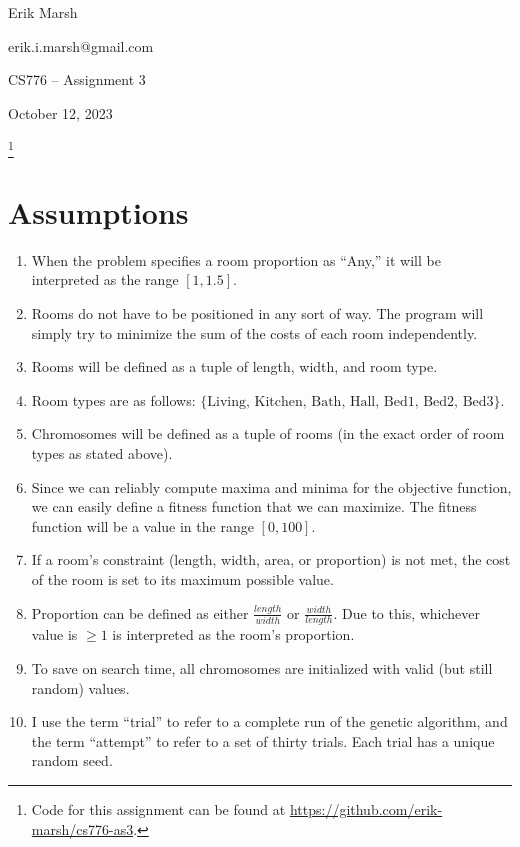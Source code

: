 \documentclass[12pt, letterpaper]{article}
\newcommand\blfootnote[1]{%
  \begingroup
  \renewcommand\thefootnote{}\footnote{#1}%
  \addtocounter{footnote}{-1}%
  \endgroup
}
\begin{document}
\noindent
Erik Marsh

\noindent
erik.i.marsh@gmail.com

\noindent
CS776 -- Assignment 3

\noindent
October 12, 2023


\blfootnote{Code for this assignment can be found at \href{https://github.com/erik-marsh/cs776-as3}{https://github.com/erik-marsh/cs776-as3}.}

\section{Assumptions}

\begin{enumerate}
    \item When the problem specifies a room proportion as ``Any,''
          it will be interpreted as the range $[1, 1.5]$.
    \item Rooms do not have to be positioned in any sort of way.
          The program will simply try to minimize the sum of the costs of each room independently.
    \item Rooms will be defined as a tuple of length, width, and room type.
    \item Room types are as follows: $\{\text{Living, Kitchen, Bath, Hall, Bed1, Bed2, Bed3}\}$.
    \item Chromosomes will be defined as a tuple of rooms (in the exact order of room types as stated above).
    \item Since we can reliably compute maxima and minima for the objective function,
          we can easily define a fitness function that we can maximize.
          The fitness function will be a value in the range $[0, 100]$.
    \item If a room's constraint (length, width, area, or proportion) is not met,
          the cost of the room is set to its maximum possible value.
    \item Proportion can be defined as either $\frac{length}{width}$ or $\frac{width}{length}$.
          Due to this, whichever value is $\geq 1$ is interpreted as the room's proportion.
    \item To save on search time, all chromosomes are initialized with valid (but still random) values.
    \item I use the term ``trial'' to refer to a complete run of the genetic algorithm,
          and the term ``attempt'' to refer to a set of thirty trials. Each trial has a unique random seed.
\end{enumerate}
\end{document}
